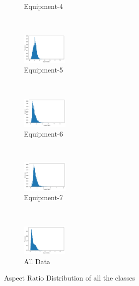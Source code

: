 \documentclass[conference]{IEEEtran}
\begin{document}
\begin{figure}
\begin{subfigure}[b]{0.45\linewidth}
        \caption{Equipment-4}
        \label{fig:excavator}
    \end{subfigure}
	\\
    \begin{subfigure}[b]{0.45\linewidth}
        \includegraphics[width=\textwidth, height=1.5cm]{images/Person_Distr.png}
        \caption{Equipment-5}
        \label{fig:person}
    \end{subfigure}
    ~
    \begin{subfigure}[b]{0.45\linewidth}
        \includegraphics[width=\textwidth, height=1.5cm]{images/Truck_Distr.png}
        \caption{Equipment-6}
        \label{fig:truck}
    \end{subfigure}
	\\
    \begin{subfigure}[b]{0.45\linewidth}
        \includegraphics[width=\textwidth, height=1.5cm]{images/Vehicle_Distr.png}
        \caption{Equipment-7}
        \label{fig:vehicle}
    \end{subfigure}
    ~
    \begin{subfigure}[b]{0.45\linewidth}
        \includegraphics[width=\textwidth, height=1.5cm]{images/all_data_Distr.png}
        \caption{All Data}
        \label{fig:alldata}
    \end{subfigure}
    \caption{Aspect Ratio Distribution of all the classes}\label{fig:ardistr}
\end{figure}
\end{document}
